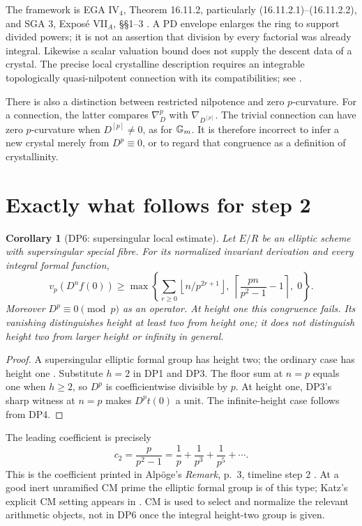 \documentclass[11pt,a4paper]{article}
\newtheorem{corollary}[theorem]{Corollary}
\theoremstyle{definition}\newtheorem{remark}[theorem]{Remark}
\newcommand{\vp}{v_p}\newcommand{\dR}{\mathrm{dR}}\newcommand{\crys}{\mathrm{crys}}
\newcommand{\ceil}[1]{\left\lceil #1\right\rceil}\newcommand{\floor}[1]{\left\lfloor #1\right\rfloor}
\begin{document}
The framework is EGA IV$_4$, Theorem 16.11.2, particularly (16.11.2.1)--(16.11.2.2), and SGA 3, Expos\'e VII$_A$, \S\S1--3 \cite{EGA,SGA3}. A PD envelope enlarges the ring to support divided powers; it is not an assertion that division by every factorial was already integral. Likewise a scalar valuation bound does not supply the descent data of a crystal. The precise local crystalline description requires an integrable topologically quasi-nilpotent connection with its compatibilities; see \cite[Proposition 60.17.4, tag 07JH]{Stacks}.

There is also a distinction between restricted nilpotence and zero $p$-curvature. For a connection, the latter compares $\nabla_D^p$ with $\nabla_{D^{[p]}}$. The trivial connection can have zero $p$-curvature when $D^{[p]}\ne0$, as for $\mathbb G_m$. It is therefore incorrect to infer a new crystal merely from $D^p\equiv0$, or to regard that congruence as a definition of crystallinity.

\section{Exactly what follows for step 2}\label{sec:step2}

\begin{corollary}[DP6: supersingular local estimate]\label{DP6}
Let $E/R$ be an elliptic scheme with supersingular special fibre. For its normalized invariant derivation and every integral formal function,
\begin{equation}\label{eq:h2}
 \vp(D^nf(0))\ge
 \max\left\{\sum_{r\ge0}\floor{n/p^{2r+1}},\;
 \ceil{\frac{pn}{p^2-1}-1},\;0\right\}.
\end{equation}
Moreover $D^p\equiv0\pmod p$ as an operator. At height one this congruence fails. Its vanishing distinguishes height at least two from height one; it does not distinguish height two from larger height or infinity in general.
\end{corollary}
\begin{proof}
A supersingular elliptic formal group has height two; the ordinary case has height one \cite[\S2.1]{Illusie}. Substitute $h=2$ in DP1 and DP3. The floor sum at $n=p$ equals one when $h\ge2$, so $D^p$ is coefficientwise divisible by $p$. At height one, DP3's sharp witness at $n=p$ makes $D^pt(0)$ a unit. The infinite-height case follows from DP4.
\end{proof}

The leading coefficient is precisely
\[
 c_2=\frac p{p^2-1}=\frac1p+\frac1{p^3}+\frac1{p^5}+\cdots.
\]
This is the coefficient printed in Alp\"oge's \emph{Remark}, p.~3, timeline step 2 \cite{Alpoge}. At a good inert unramified CM prime the elliptic formal group is of this type; Katz's explicit CM setting appears in \cite[\S IV, (4.1)--(4.6), pp.~675--676]{Katz81}. CM is used to select and normalize the relevant arithmetic objects, not in DP6 once the integral height-two group is given.
\end{document}
